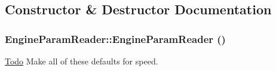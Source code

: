 \subsection{Constructor \& Destructor Documentation}
\hypertarget{classEngineParamReader_a0fcc8aa5dcc6a42dc88e94f7177d4322}{
\subsubsection[{EngineParamReader}]{\setlength{\rightskip}{0pt plus 5cm}EngineParamReader::EngineParamReader ()}}
\label{classEngineParamReader_a0fcc8aa5dcc6a42dc88e94f7177d4322}
\begin{Desc}
\item[\hyperlink{todo__todo000001}{Todo}]Make all of these defaults for speed. \end{Desc}


